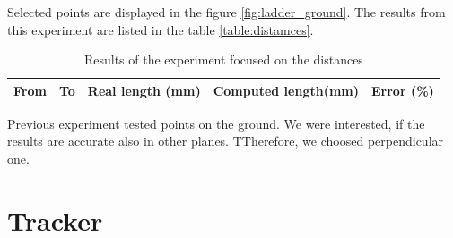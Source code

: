 Selected points are displayed in the figure \ref{fig:ladder_ground}. The
results from this experiment are listed in the table \ref{table:distamces}. 


\begin{table}
\centering
\begin{tabular}{|r|r|r|r|r|}
\hline
From	& To	& Real length (mm) & Computed length(mm) & Error (\%) \\
\hline
\hline

\hline
\end{tabular}
\label{table:distances}
\caption{Results of the experiment focused on the distances}
\end{table}


Previous experiment tested points on the ground. We were interested, if the results are accurate also in other planes. TTherefore, we choosed perpendicular one.

\section{Tracker}

